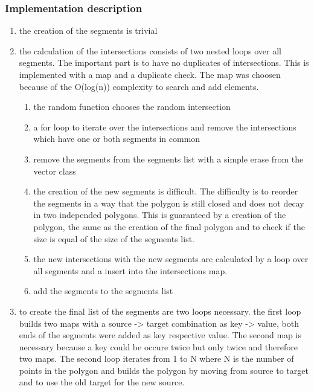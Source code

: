 \subsubsection{Implementation description}
\begin{enumerate}
  \item the creation of the segments is trivial
  \item the calculation of the intersections consists of two nested
    loops over all segments. The important part is to have no
    duplicates of intersections. This is implemented with a map and a
    duplicate check. The map was choosen because of the O(log(n))
    complexity to search and add elements.
  \begin{enumerate}
    \item the random function chooses the random intersection
    \item a for loop to iterate over the intersections and remove the
      intersections which have one or both segments in common
    \item remove the segments from the segments list with a simple erase from
      the vector class
    \item the creation of the new segments is difficult. The
      difficulty is to reorder the segments in a way that the polygon
      is still closed and does not decay in two independed polygons.
      This is guaranteed by a creation of the polygon, the same as the
      creation of the final polygon and to check if the size is equal
      of the size of the segments list.
    \item the new intersections with the new segments are calculated
      by a loop over all segments and a insert into the intersections
      map.
    \item add the segments to the segments list
  \end{enumerate}
  \item to create the final list of the segments are two loops
    necessary. the first loop builds two maps with a source -> target
    combination as key -> value, both ends of the segments were added
    as key respective value. The second map is necessary because a key
    could be occure twice but only twice and therefore two maps. The
    second loop iterates from 1 to N where N is the number of points
    in the polygon and builds the polygon by moving from source to
    target and to use the old target for the new source.
\end{enumerate}

